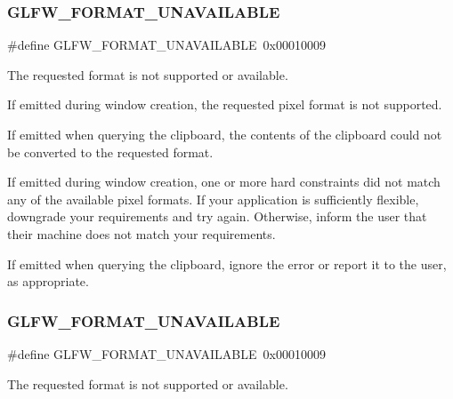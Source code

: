 \subsubsection{\texorpdfstring{G\+L\+F\+W\+\_\+\+F\+O\+R\+M\+A\+T\+\_\+\+U\+N\+A\+V\+A\+I\+L\+A\+B\+LE}{GLFW\_FORMAT\_UNAVAILABLE}\hspace{0.1cm}{\footnotesize\ttfamily [3/5]}}
{\footnotesize\ttfamily \#define G\+L\+F\+W\+\_\+\+F\+O\+R\+M\+A\+T\+\_\+\+U\+N\+A\+V\+A\+I\+L\+A\+B\+LE~0x00010009}



The requested format is not supported or available. 

If emitted during window creation, the requested pixel format is not supported.

If emitted when querying the clipboard, the contents of the clipboard could not be converted to the requested format.

If emitted during window creation, one or more hard constraints did not match any of the available pixel formats. If your application is sufficiently flexible, downgrade your requirements and try again. Otherwise, inform the user that their machine does not match your requirements.

\begin{DoxyParagraph}{}
If emitted when querying the clipboard, ignore the error or report it to the user, as appropriate. 
\end{DoxyParagraph}
\mbox{\label{group__errors_ga196e125ef261d94184e2b55c05762f14}} 
\subsubsection{\texorpdfstring{G\+L\+F\+W\+\_\+\+F\+O\+R\+M\+A\+T\+\_\+\+U\+N\+A\+V\+A\+I\+L\+A\+B\+LE}{GLFW\_FORMAT\_UNAVAILABLE}\hspace{0.1cm}{\footnotesize\ttfamily [4/5]}}
{\footnotesize\ttfamily \#define G\+L\+F\+W\+\_\+\+F\+O\+R\+M\+A\+T\+\_\+\+U\+N\+A\+V\+A\+I\+L\+A\+B\+LE~0x00010009}



The requested format is not supported or available. 

